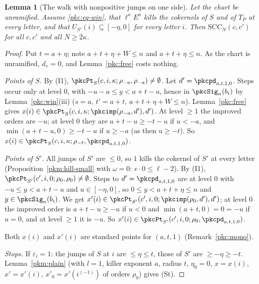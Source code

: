 \documentclass[10pt]{amsart}
\newtheorem{lemma}[theorem]{Lemma}
\theoremstyle{definition}
\theoremstyle{remark}
\begin{document}
\begin{lemma}[The walk with nonpositive jumps on one side]\label{pkc:nonpos}
Let the chart be unramified. Assume \eqref{pkc:eq-win}, that $\ell^\kappa E^a$ kills the cokernels of $S$
and of $T_P$ at every letter, and that $U_{S'}(i)\subseteq[-\eta,0]$ for every letter $i$. Then
$\mathrm{SCC}_N(c,c')$ for all $c,c'$ and all $N\ge2\kappa$.
\end{lemma}

\begin{proof}
Put $t=a+\eta$; note $a+t+\eta+W\le n$ and $a+t+\eta\le n$. As the chart is unramified, $d_v=0$, and
Lemma~\ref{pkc:free} costs nothing.

\emph{Points of $S$.} By (I1), $\pkcPt_S(c,i,\kappa;\rho_{-a},\rho_{-a})\ne\emptyset$. Let
$d'=\pkcpd_{a,t,1,0}$. Steps occur only at level $0$, with $-u-a\le y<a+t-u$, hence in
$\pkcSig_n(b_i)$ by Lemma~\ref{pkc:win}(iii) ($s=a$, $t'=a+t$, $a+t+\eta+W\le n$). Lemma~\ref{pkc:free}
gives $x(i)\in\pkcPt_S(c,i,\kappa;\pkcimp(\rho_{-a},d'),d')$. At level $\ge1$ the improved orders are
$-u$; at level $0$ they are $a+t-u\ge-t-u$ if $u<-a$, and $\min(a+t-u,0)\ge-t-u$ if $u\ge-a$ (as then
$u\ge-t$). So $x(i)\in\pkcPt_S(c,i,\kappa;\rho_{-t},\pkcpd_{a,t,1,0})$.

\emph{Points of $S'$.} All jumps of $S'$ are $\le0$, so $1$ kills the cokernel of $S'$ at every letter
(Proposition~\ref{pkm:kill-small} with $\omega=0$: $e\cdot0\le\ell-2$). By (I1),
$\pkcPt_{S'}(c',i,0;\rho_0,\rho_0)\ne\emptyset$. Steps to $d'=\pkcpd_{a,t,1,0}$ are at level $0$ with
$-u\le y<a+t-u$ and $u\in[-\eta,0]$, so $0\le y<a+t+\eta\le n$ and $y\in\pkcSig_n(b_i)$. We get
$x'(i)\in\pkcPt_{S'}(c',i,0;\pkcimp(\rho_0,d'),d')$; at level $0$ the improved order is
$a+t-u\ge-u$ if $u<0$ and $\min(a+t,0)=0=-u$ if $u=0$, and at level $\ge1$ it is $-u$. So
$x'(i)\in\pkcPt_{S'}(c',i,0;\rho_0,\pkcpd_{a,t,1,0})$.

Both $x(i)$ and $x'(i)$ are standard points for $(a,t,1)$ (Remark~\ref{pkc:mono}).

\emph{Stops.} If $\varepsilon_i=1$: the jumps of $S$ at $i$ are $\le\eta\le t$, those of $S'$ are
$\ge-\eta\ge-t$. Lemma~\ref{pkm:plain} (with $l=1$, killer exponent $a$, radius $t$, $\eta_0=0$,
$x=x(i)$, $x'=x'(i)$, $x'_0=x'(i^{(-1)})$ of orders $\rho_0$) gives (St).


\end{proof}
\end{document}
